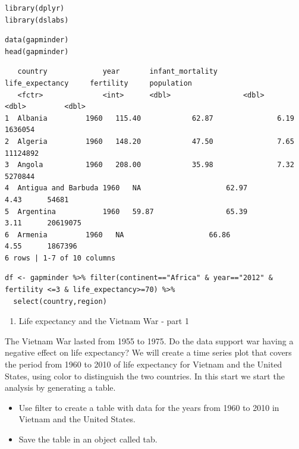\documentclass[
]{article}
\providecommand{\tightlist}{%
  \setlength{\itemsep}{0pt}\setlength{\parskip}{0pt}}
\begin{document}
\begin{verbatim}
library(dplyr)
library(dslabs)
\end{verbatim}

\begin{verbatim}
data(gapminder)
head(gapminder)
\end{verbatim}

\begin{verbatim}
   country             year       infant_mortality      life_expectancy     fertility     population
   <fctr>              <int>      <dbl>                 <dbl>               <dbl>         <dbl>
1  Albania         1960   115.40            62.87               6.19      1636054   
2  Algeria         1960   148.20            47.50               7.65      11124892  
3  Angola          1960   208.00            35.98               7.32      5270844   
4  Antigua and Barbuda 1960   NA                    62.97               4.43      54681 
5  Argentina           1960   59.87                 65.39               3.11      20619075  
6  Armenia         1960   NA                    66.86               4.55      1867396   
6 rows | 1-7 of 10 columns
\end{verbatim}

\begin{verbatim}
df <- gapminder %>% filter(continent=="Africa" & year=="2012" & fertility <=3 & life_expectancy>=70) %>%
  select(country,region)
\end{verbatim}

\begin{enumerate}
\def\labelenumi{\arabic{enumi}.}
\setcounter{enumi}{3}
\tightlist
\item
  Life expectancy and the Vietnam War - part 1
\end{enumerate}

The Vietnam War lasted from 1955 to 1975. Do the data support war having
a negative effect on life expectancy? We will create a time series plot
that covers the period from 1960 to 2010 of life expectancy for Vietnam
and the United States, using color to distinguish the two countries. In
this start we start the analysis by generating a table.

\begin{itemize}
\tightlist
\item
  Use filter to create a table with data for the years from 1960 to 2010
  in Vietnam and the United States.
\item
  Save the table in an object called tab.
\end{itemize}
\end{document}
